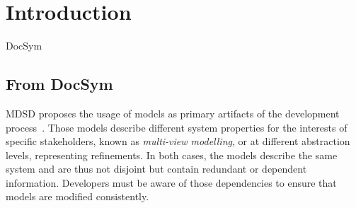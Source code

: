 \chapter{Introduction
}
\label{chap:introduction}


\begin{copiedFrom}{DocSym}

\section{From DocSym}


\acl{MDSD} proposes the usage of models as primary artifacts of the %
development process~\cite{stahl2006a}. 
Those models describe different system properties for the interests of specific stakeholders, known as \emph{multi-view modelling}, or at different abstraction levels, representing refinements. In both cases, the models describe the same system and are thus not disjoint but contain redundant or dependent information. 
Developers must be aware of those dependencies to ensure that models are modified consistently. 


\end{copiedFrom}

